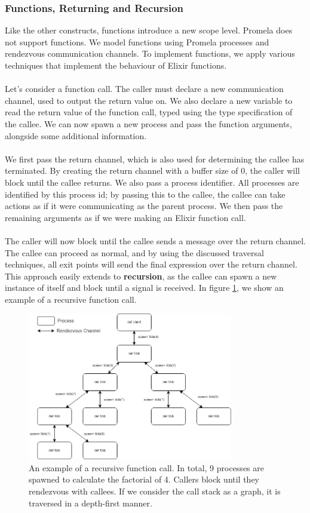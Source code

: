 \subsubsection{Functions, Returning and Recursion}
Like the other constructs, functions introduce a new scope level. Promela does not support functions. We model functions using Promela processes and rendezvous communication channels. To implement functions, we apply various techniques that implement the behaviour of Elixir functions. 
\\ \\
Let's consider a function call. The caller must declare a new communication channel, used to output the return value on. We also declare a new variable to read the return value of the function call, typed using the type specification of the callee. We can now spawn a new process and pass the function arguments, alongside some additional information. 
\\ \\
We first pass the return channel, which is also used for determining the callee has terminated. By creating the return channel with a buffer size of 0, the caller will block until the callee returns. We also pass a process identifier. All processes are identified by this process id; by passing this to the callee, the callee can take actions as if it were communicating as the parent process. We then pass the remaining arguments as if we were making an Elixir function call. 
\\ \\
The caller will now block until the callee sends a message over the return channel. The callee can proceed as normal, and by using the discussed traversal techniques, all exit points will send the final expression over the return channel. This approach easily extends to \textbf{recursion}, as the callee can spawn a new instance of itself and block until a signal is received. In figure \ref{fig:function_call}, we show an example of a recursive function call.
\begin{figure}[h]
    \centering
    \includegraphics[width=0.8\textwidth]{images/function_call.drawio.png}
    \caption{An example of a recursive function call. In total, 9 processes are spawned to calculate the factorial of 4. Callers block until they rendezvous with callees. If we consider the call stack as a graph, it is traversed in a depth-first manner.}
    \label{fig:function_call}
\end{figure}
